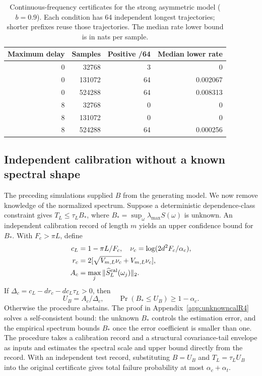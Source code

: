\documentclass[aps,pre,reprint,amsmath,amssymb,superscriptaddress]{revtex4-2}
\begin{document}
\begin{table}[t]
\caption{\label{tab:rate}Continuous-frequency certificates for the strong asymmetric model ($b=0.9$). Each condition has 64 independent longest trajectories; shorter prefixes reuse those trajectories. The median rate lower bound is in nats per sample.}
\begin{ruledtabular}
\begin{tabular}{rrrr}
Maximum delay & Samples & Positive /64 & Median lower rate\\
\hline
0 & 32768 & 3 & 0\\
0 & 131072 & 64 & 0.002067\\
0 & 524288 & 64 & 0.008313\\
8 & 32768 & 0 & 0\\
8 & 131072 & 0 & 0\\
8 & 524288 & 64 & 0.000256\\
\end{tabular}
\end{ruledtabular}
\end{table}

\subsection{Independent calibration without a known spectral shape}\label{sec:unknowncalR4}
The preceding simulations supplied $B$ from the generating model. We now remove knowledge of the normalized spectrum. Suppose a deterministic dependence-class constraint gives $T_L\le\tau_L B_*$, where $B_*=\sup_\omega\lambda_{\max}S(\omega)$ is unknown. An independent calibration record of length $m$ yields an upper confidence bound for $B_*$. With $F_c>\pi L$, define
\begin{align}
 c_L&=1-\pi L/F_c,\quad \nu_c=\log(2d^2F_c/\alpha_c),\\
 r_c&=2[\sqrt{V_{m,L}\nu_c}+V_{m,L}\nu_c],\\
 A_c&=\max_j\|\widehat S_L^{\rm cal}(\omega_j)\|_2.
\end{align}
If $\Delta_c=c_L-dr_c-dc_L\tau_L>0$, then
\begin{equation}\label{eq:calUmain}
 U_B=A_c/\Delta_c,\qquad
 \Pr(B_*\le U_B)\ge1-\alpha_c.
\end{equation}
Otherwise the procedure abstains. The proof in Appendix~\ref{app:unknowncalR4} solves a self-consistent bound: the unknown $B_*$ controls the estimation error, and the empirical spectrum bounds $B_*$ once the error coefficient is smaller than one. The procedure takes a calibration record and a structural covariance-tail envelope as inputs and estimates the spectral scale and upper bound directly from the record. With an independent test record, substituting $B=U_B$ and $T_L=\tau_LU_B$ into the original certificate gives total failure probability at most $\alpha_c+\alpha_t$.
\end{document}
